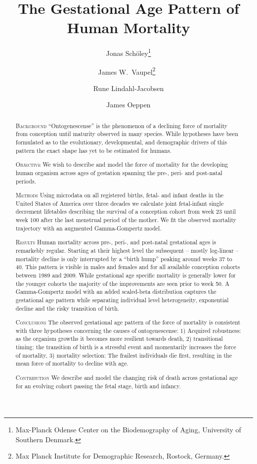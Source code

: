 \documentclass[12pt, parskip=half]{scrartcl}
\title{The Gestational Age Pattern of Human Mortality}
\author{
  Jonas Schöley\thanks{Max-Planck Odense Center on the Biodemography of Aging, University of Southern Denmark.}
  \and
  James W.~Vaupel\thanks{Max Planck Institute for Demographic Research, Rostock, Germany.}~\footnotemark[1]
  \and
  Rune Lindahl-Jacobsen\footnotemark[1]
  \and
  James Oeppen\footnotemark[1]
}
\begin{document}
\maketitle

\thispagestyle{empty}

\begin{abstract}
\textsc{Background}
\enquote{Ontogenescense} is the phenomenon of a declining force of mortality from conception until maturity observed in many species. While hypotheses have been formulated as to the evolutionary, developmental, and demographic drivers of this pattern the exact shape has yet to be estimated for humans.

\textsc{Objective}
We wish to describe and model the force of mortality for the developing human organism across ages of gestation spanning the pre-, peri- and post-natal periods.

\textsc{Methods}
Using microdata on all registered births, fetal- and infant deaths in the United States of America over three decades we calculate joint fetal-infant single decrement lifetables describing the survival of a conception cohort from week 23 until week 100 after the last menstrual period of the mother. We fit the observed mortality trajectory with an augmented Gamma-Gompertz model.

\textsc{Results}
Human mortality across pre-, peri-, and post-natal gestational ages is remarkebly regular. Starting at their highest level the subsequent -- mostly log-linear -- mortality decline is only interrupted by a \enquote{birth hump} peaking around weeks 37 to 40. This pattern is visible in males and females and for all available conception cohorts between 1989 and 2009. While gestational age specific mortality is generally lower for the younger cohorts the majority of the improvements are seen prior to week 50. A Gamma-Gompertz model with an added scaled-beta distribution captures the gestational age pattern while separating individual level heterogeneity, exponential decline and the risky transition of birth.

\textsc{Conclusions}
The observed gestational age pattern of the force of mortality is consistent with three hypotheses concerning the causes of ontogenescense: 1) Acquired robustness: as the organism growths it becomes more resilient towards death, 2) transitional timing: the transition of birth is a stressful event and momentarily increases the force of mortality, 3) mortality selection: The frailest individuals die first, resulting in the mean force of mortality to decline with age.

\textsc{Contribution}
We describe and model the changing risk of death across gestational age for an evolving cohort passing the fetal stage, birth and infancy.
\end{abstract}
\end{document}
